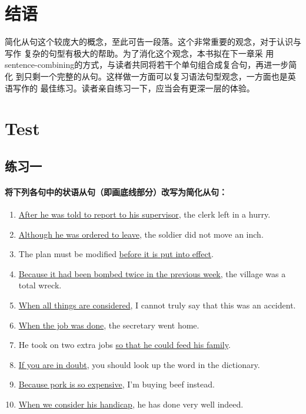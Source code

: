 \section{结语}

简化从句这个较庞大的概念，至此可告一段落。这个非常重要的观念，对于认识与写作
复杂的句型有极大的帮助。为了消化这个观念，本书拟在下一章采
用sentence-combining的方式，与读者共同将若干个单句组合成复合句，再进一步简化
到只剩一个完整的从句。这样做一方面可以复习语法句型观念，一方面也是英语写作的
最佳练习。读者亲自练习一下，应当会有更深一层的体验。

\section{Test}

\subsection{练习一}

\paragraph{将下列各句中的状语从句（即画底线部分）改写为简化从句：}

\begin{enumerate}
\item \ul{After he was told to report to his supervisor}, the clerk left in a
hurry.

\item \ul{Although he was ordered to leave}, the soldier did not move an inch.

\item The plan must be modified \ul{before it is put into effect}.

\item \ul{Because it had been bombed twice in the previous week}, the village
was a total wreck.

\item \ul{When all things are considered}, I cannot truly say that this was an
accident.

\item \ul{When the job was done}, the secretary went home.

\item He took on two extra jobs \ul{so that he could feed his family}.

\item \ul{If you are in doubt}, you should look up the word in the dictionary.

\item \ul{Because pork is so expensive}, I'm buying beef instead.

\item \ul{ When we consider his handicap}, he has done very well indeed.
\end{enumerate}

